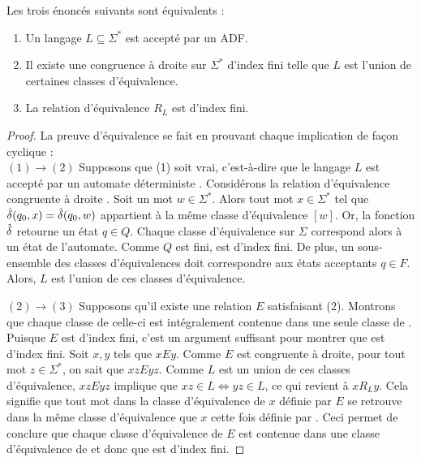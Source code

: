 	\begin{theorem}
		Les trois énoncés suivants sont équivalents :
		\begin{enumerate}
			\item Un langage $L\subseteq\Sigma^*$ est accepté par un ADF.
			\item Il existe une congruence à droite sur $\Sigma^*$ d'index fini telle que $L$ est l'union de certaines classes d'équivalence.
			\item La relation d'équivalence $R_L$ est d'index fini.
		\end{enumerate}
	\end{theorem}


	\begin{proof}\label{proof:mn}
		La preuve d'équivalence se fait en prouvant chaque implication de façon cyclique :\\

		$(1)\rightarrow(2)$ Supposons que (1) soit vrai, c'est-à-dire que le langage $L$ est accepté par un automate déterministe \automaton. Considérons la relation d'équivalence congruente à droite \ra. Soit un mot $w\in\Sigma^*$. Alors tout mot $x\in\Sigma^*$ tel que $\hat{\delta}(q_0,x)=\hat{\delta}(q_0,w)$ appartient à la même classe d'équivalence $[w]$. Or, la fonction $\hat{\delta}$ retourne un état $q\in Q$. Chaque classe d'équivalence sur $\Sigma$ correspond alors à un état de l'automate. Comme $Q$ est fini, \ra est d'index fini. De plus, un sous-ensemble des classes d'équivalences doit correspondre aux états acceptants $q\in F$. Alors, $L$ est l'union de ces classes d'équivalence.

		$(2)\rightarrow(3)$ Supposons qu'il existe une relation $E$ satisfaisant (2). Montrons que chaque classe de celle-ci est intégralement contenue dans une seule classe de \rl. Puisque $E$ est d'index fini, c'est un argument suffisant pour montrer que \rl est d'index fini. Soit $x,y$ tels que $xEy$. Comme $E$ est congruente à droite, pour tout mot $z \in \Sigma^*$, on sait que $xzEyz$. Comme $L$ est un union de ces classes d'équivalence, $xzEyz$ implique que $xz \in L \Leftrightarrow yz \in L$, ce qui revient à $xR_Ly$. Cela signifie que tout mot dans la classe d'équivalence de $x$ définie par $E$ se retrouve dans la même classe d'équivalence que $x$ cette fois définie par \rl. Ceci permet de conclure que chaque classe d'équivalence de $E$ est contenue dans une classe d'équivalence de \rl et donc que \rl est d'index fini.


\end{proof}
